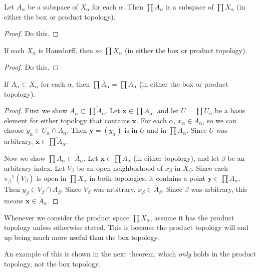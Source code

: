 \documentclass[10pt]{report}
\begin{document}
\begin{prop}
	Let $A_{\alpha}$ be a subspace of $X_{\alpha}$ for each $\alpha$. Then $\prod A_{\alpha}$ is a subspace of $\prod X_{\alpha}$ (in either the box or product topology).
\end{prop}
\begin{proof}
{\color{red}Do this.}
\end{proof}

\begin{prop}
	If each $X_{\alpha}$ is Hausdorff, then so $\prod X_{\alpha}$ (in either the box or product topology).
\end{prop}
\begin{proof}
{\color{red}Do this.}
\end{proof}

\begin{prop}
	If $A_{\alpha}\subset X_{\alpha}$ for each $\alpha$, then $\prod \overline{A}_{\alpha} = \overline{\prod A_{\alpha}} $ (in either the box or product topology).
\end{prop}
\begin{proof}
	First we show $\overline{A}_{\alpha} \subset \overline{\prod A_{\alpha}}$. Let $\mathbf{x} \in \prod \overline{A}_{\alpha}$, and let $U = \prod U_{\alpha}$ be a basis element for either topology that contains $\mathbf{x}$. For each $\alpha$, $x_{\alpha}\in \overline{A}_{\alpha}$, so we can choose $y_{\alpha}\in U_{\alpha}\cap A_{\alpha}$. Then $\mathbf{y} = (y_{\alpha})$ is in $U$ and in $\prod A_{\alpha}$. Since $U$ was arbitrary, $\mathbf{x} \in \overline{\prod A_{\alpha}} $.

	Now we show $\overline{\prod A_{\alpha}} \subset \overline{A}_{\alpha}$. Let $\mathbf{x} \in \overline{\prod A_{\alpha}}$ (in either topology), and let $\beta$ be an arbitrary index. Let $V_{\beta}$ be an open neighborhood of $x_{\beta}$ in $X_{\beta}$. Since each $\pi_{\beta}^{-1}(V_{\beta})$ is open in $\prod X_{\alpha}$ in both topologies, it contains a point $\mathbf{y} \in \prod A_{\alpha}$. Then $y_{\beta}\in V_\beta \cap A_{\beta}$. Since $V_{\beta}$ was arbitrary, $x_{\beta} \in \overline{A}_{\beta}$. Since $\beta$ was arbitrary, this means $\mathbf{x} \in \overline{A}_{\alpha}$.
\end{proof}

\begin{note}{}{}
Whenever we consider the product space $\prod X_{\alpha}$, assume it has the product topology unless otherwise stated. This is because the product topology will end up being much more useful than the box topology.

An example of this is shown in the next theorem, which \textit{only} holds in the product topology, not the box topology.
\end{note}
\end{document}
